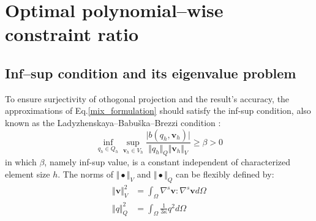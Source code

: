 \section{Optimal polynomial--wise constraint ratio}
\subsection{Inf--sup condition and its eigenvalue problem}

To ensure surjectivity of othogonal projection and the result's accuracy, the approximations of Eq.\eqref{mix_formulation} should satisfy the inf-sup condition, also known as the Ladyzhenskaya–Babuška–Brezzi condition \cite{bathe1996}:
\begin{equation}\label{infsup}
    \inf_{q_h \in Q_h} \sup_{\boldsymbol v_h \in V_h} \frac{\vert b(q_h,\boldsymbol v_h) \vert}{\Vert q_h \Vert_Q \Vert \boldsymbol v_h \Vert_V} \ge \beta > 0
\end{equation}
in which $\beta$, namely inf-sup value, is a constant independent of characterized element size $h$.
The norms of $\Vert \bullet \Vert_V$ and $\Vert \bullet \Vert_Q$ can be flexibly defined by:
\begin{align}
    \label{norm_V}
    \Vert \boldsymbol v\Vert_V^2 &= \int_\Omega \nabla^s \boldsymbol v : \nabla^s \boldsymbol v d\Omega \\
    \label{norm_Q}
    \Vert q \Vert_Q^2 &= \int_\Omega \frac{1}{3\kappa}q^2 d\Omega
\end{align}


